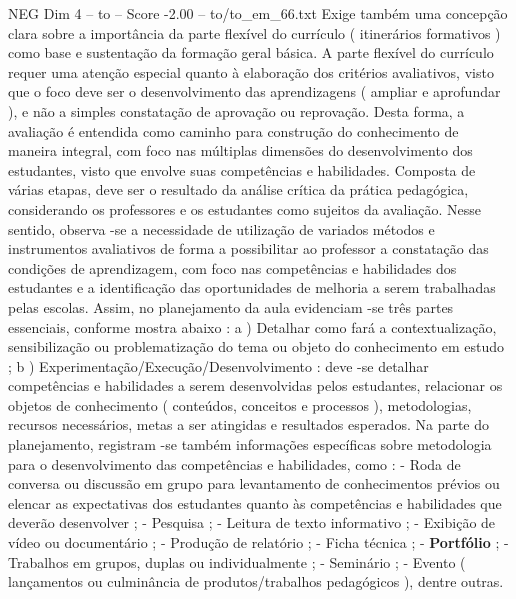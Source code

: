 \begin{textsample}{NEG Dim 4 – to – Score -2.00 – to/to\_em\_66.txt}
Exige também uma concepção clara sobre a importância da parte flexível do currículo ( itinerários formativos ) como base e sustentação da formação geral básica.
A parte flexível do currículo requer uma atenção especial quanto à elaboração dos critérios avaliativos, visto que o foco deve ser o desenvolvimento das aprendizagens ( ampliar e aprofundar ), e não a simples constatação de aprovação ou reprovação.
Desta forma, a avaliação é entendida como caminho para construção do conhecimento de maneira integral, com foco nas múltiplas dimensões do desenvolvimento dos estudantes, visto que envolve suas competências e habilidades.
Composta de várias etapas, deve ser o resultado da análise crítica da prática pedagógica, considerando os professores e os estudantes como sujeitos da avaliação.
Nesse sentido, observa -se a necessidade de utilização de variados métodos e instrumentos avaliativos de forma a possibilitar ao professor a constatação das condições de aprendizagem, com foco nas competências e habilidades dos estudantes e a identificação das oportunidades de melhoria a serem trabalhadas pelas escolas.
Assim, no planejamento da aula evidenciam -se três partes essenciais, conforme mostra abaixo : a ) Detalhar como fará a contextualização, sensibilização ou problematização do tema ou objeto do conhecimento em estudo ; b ) Experimentação/Execução/Desenvolvimento : deve -se detalhar competências e habilidades a serem desenvolvidas pelos estudantes, relacionar os objetos de conhecimento ( conteúdos, conceitos e processos ), metodologias, recursos necessários, metas a ser atingidas e resultados esperados.
Na parte do planejamento, registram -se também informações específicas sobre metodologia para o desenvolvimento das competências e habilidades, como : - Roda de conversa ou discussão em grupo para levantamento de conhecimentos prévios ou elencar as expectativas dos estudantes quanto às competências e habilidades que deverão desenvolver ; - Pesquisa ; - Leitura de texto informativo ; - Exibição de vídeo ou documentário ; - Produção de relatório ; - Ficha técnica ; - \textbf{Portfólio} ; - Trabalhos em grupos, duplas ou individualmente ; - Seminário ; - Evento ( lançamentos ou culminância de produtos/trabalhos pedagógicos ), dentre outras.

\end{textsample}
